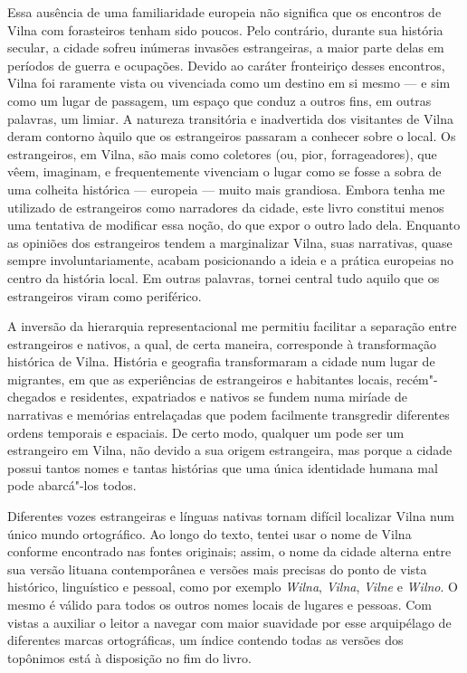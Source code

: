Essa ausência de uma familiaridade europeia não significa que os
encontros de Vilna com forasteiros tenham sido poucos. Pelo contrário,
durante sua história secular, a cidade sofreu inúmeras invasões
estrangeiras, a maior parte delas em períodos de guerra e ocupações.
Devido ao caráter fronteiriço desses encontros, Vilna foi raramente
vista ou vivenciada como um destino em si mesmo --- e sim como um lugar de
passagem, um espaço que conduz a outros fins, em outras palavras, um
limiar. A natureza transitória e inadvertida dos visitantes de Vilna
deram contorno àquilo que os estrangeiros passaram a conhecer sobre o
local. Os estrangeiros, em Vilna, são mais como coletores (ou, pior,
forrageadores), que vêem, imaginam, e frequentemente vivenciam o lugar
como se fosse a sobra de uma colheita histórica --- europeia --- muito mais
grandiosa. Embora tenha me utilizado de estrangeiros como narradores da
cidade, este livro constitui menos uma tentativa de modificar essa
noção, do que expor o outro lado dela. Enquanto as opiniões dos
estrangeiros tendem a marginalizar Vilna, suas narrativas, quase sempre
involuntariamente, acabam posicionando a ideia e a prática europeias no
centro da história local. Em outras palavras, tornei central tudo aquilo
que os estrangeiros viram como periférico.

A inversão da hierarquia representacional me permitiu facilitar a
separação entre estrangeiros e nativos, a qual, de certa maneira,
corresponde à transformação histórica de Vilna. História e geografia
transformaram a cidade num lugar de migrantes, em que as experiências de
estrangeiros e habitantes locais, recém"-chegados e residentes,
expatriados e nativos se fundem numa miríade de narrativas e memórias
entrelaçadas que podem facilmente transgredir diferentes ordens
temporais e espaciais. De certo modo, qualquer um pode ser um
estrangeiro em Vilna, não devido a sua origem estrangeira, mas porque a
cidade possui tantos nomes e tantas histórias que uma única identidade
humana mal pode abarcá"-los todos.

Diferentes vozes estrangeiras e línguas nativas tornam difícil localizar
Vilna num único mundo ortográfico. Ao longo do texto, tentei usar o nome
de Vilna conforme encontrado nas fontes originais; assim, o nome da
cidade alterna entre sua versão lituana contemporânea e versões mais
precisas do ponto de vista histórico, linguístico e pessoal, como por
exemplo \textit{Wilna}, \textit{Vilna}, \textit{Vilne} e \textit{Wilno}. O mesmo
é válido para todos os outros nomes locais de lugares e pessoas. Com
vistas a auxiliar o leitor a navegar com maior suavidade por esse
arquipélago de diferentes marcas ortográficas, um índice contendo todas
as versões dos topônimos está à disposição no fim do livro.

